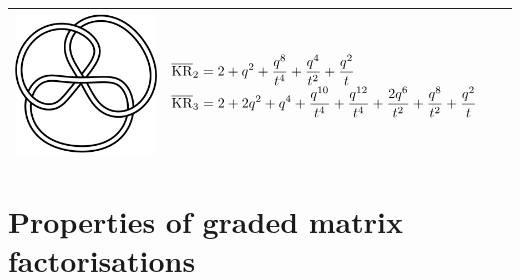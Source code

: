 \documentclass{compositio}
\theoremstyle{definition}
\numberwithin{equation}{section}
\begin{document}
{\begin{longtable}{p{}|p{}}
\includegraphics[scale=0.07,angle=0]{link6_3_3.pdf} 
& 
$
\displaystyle{%
\overline{\KR}_{2} = 2+q^2+\frac{q^8}{t^4}+\frac{q^4}{t^2}+\frac{q^2}{t}
}
$
\newline 
$
\displaystyle{%
\overline{\KR}_{3} = 2+2 q^2+q^4+\frac{q^{10}}{t^4}+\frac{q^{12}}{t^4}+\frac{2 q^6}{t^2}+\frac{q^8}{t^2}+\frac{q^2}{t}
}
$
\\
\hline
\end{longtable}
}


\newpage
\appendix

\section{Properties of graded matrix factorisations}\label{appendix:graded_mfs}
\end{document}
